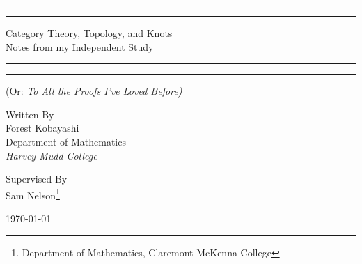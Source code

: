 \documentclass{fkbook}
\newcommand{\plogo}{\fbox{$\mathcal{FK}$}} %
\theoremstyle{snazzydefinition}
\begin{document}
\pagestyle{plain}
\frontmatter
\begin{titlepage} %

  \centering\scshape

  \rule{\textwidth}{1pt}\vspace*{-\baselineskip}\vspace*{2pt}
  \rule{\textwidth}{0.4pt}

  \vspace{0.75\baselineskip} %

  {\LARGE Category Theory, Topology, and Knots\\}
  {\Large Notes from my Independent Study\\}

  \vspace{0.75\baselineskip} %

  \rule{\textwidth}{0.4pt}\vspace*{-\baselineskip}\vspace*{2.4pt}
  \rule{\textwidth}{1pt}

  \vspace{\baselineskip} %


  {\large (\normalfont Or: \itshape To All the Proofs I've Loved Before)}

  \vspace*{12\baselineskip}


  {Written By\\}
  {\Large Forest Kobayashi\\} %
  \vspace{2\baselineskip}
  {Department of Mathematics\\}
  {\itshape Harvey Mudd College\\} %

  \vfill %


  {\small Supervised By\\}
  {Sam Nelson\footnote{Department of Mathematics, Claremont McKenna College}\\}
  \vspace{4\baselineskip}

  \plogo %

  \vspace{0.3\baselineskip} %

  {\large \normalfont \today} %


\end{titlepage}
\end{document}
